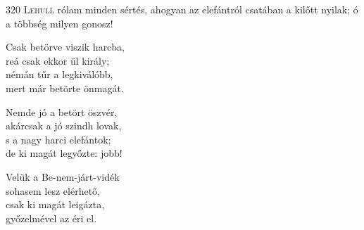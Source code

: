 
\begin{firstdhpverse}{320}
\lettrine[slope=0.5em]{L}{ehull} {\LettrineTextFont rólam minden sértés,}\newline
ahogyan az elefántról\newline
csatában a kilőtt nyilak;\newline
ó a többség milyen gonosz!
\end{firstdhpverse}

\begin{dhpverse}

 Csak betörve viszik harcba,\\
reá csak ekkor ül király;\\
némán tűr a legkiválóbb,\\
mert már betörte önmagát.

 Nemde jó a betört öszvér,\\
akárcsak a jó szindh lovak,\\
s a nagy harci elefántok;\\
de ki magát legyőzte: jobb!

 Velük a Be-nem-járt-vidék\\
sohasem lesz elérhető,\\
csak ki magát leigázta,\\
győzelmével az éri el.

\end{dhpverse}
\newpage
